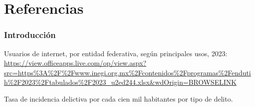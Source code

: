 \documentclass{article}
\begin{document}
%



\section{\label{ref-014}Referencias}

\subsubsection{Introducci{\'{o}}n}

Usuarios de internet, por entidad federativa, seg{{\'{u}}}n principales usos, 2023: \url{https://view.officeapps.live.com/op/view.aspx?src=https\%3A\%2F\%2Fwww.inegi.org.mx\%2Fcontenidos\%2Fprogramas\%2Fendutih\%2F2023\%2Ftabulados\%2F2023_u2ed244.xlsx&wdOrigin=BROWSELINK}

Tasa de incidencia delictiva por cada cien mil habitantes por tipo de delito.
\end{document}
